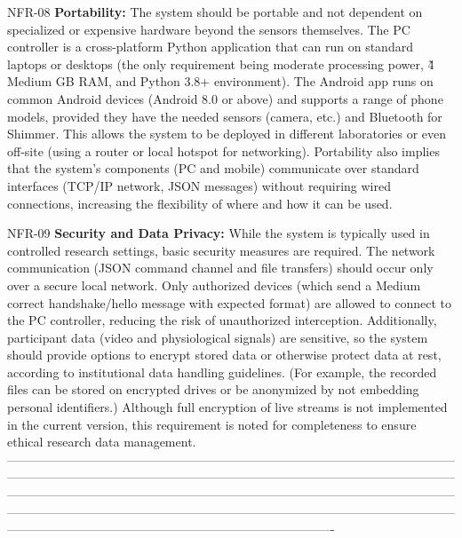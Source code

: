   NFR-08                  \textbf{Portability:} The system should be portable and not dependent on specialized or expensive hardware beyond the sensors themselves. The PC controller is a cross-platform Python application that can run on standard laptops or desktops (the only requirement being moderate processing power, \~4 Medium
                          GB RAM, and Python 3.8+ environment). The Android app runs on common Android devices (Android 8.0 or above) and supports a range of phone models, provided they have the needed sensors (camera, etc.) and Bluetooth for Shimmer. This allows the system to be deployed in different laboratories or  
                          even off-site (using a router or local hotspot for networking). Portability also implies that the system's components (PC and mobile) communicate over standard interfaces (TCP/IP network, JSON messages) without requiring wired connections, increasing the flexibility of where and how it can be 
                          used.                                                                                                                                                                                                                                                                                                 

  NFR-09                  \textbf{Security and Data Privacy:} While the system is typically used in controlled research settings, basic security measures are required. The network communication (JSON command channel and file transfers) should occur only over a secure local network. Only authorized devices (which send a     Medium
                          correct handshake/hello message with expected format) are allowed to connect to the PC controller, reducing the risk of unauthorized interception. Additionally, participant data (video and physiological signals) are sensitive, so the system should provide options to encrypt stored data or     
                          otherwise protect data at rest, according to institutional data handling guidelines. (For example, the recorded files can be stored on encrypted drives or be anonymized by not embedding personal identifiers.) Although full encryption of live streams is not implemented in the current version,  
                          this requirement is noted for completeness to ensure ethical research data management.                                                                                                                                                                                                                
  -------------------------------------------------------------------------------------------------------------------------------------------------------------------------------------------------------------------------------------------------------------------------------------------------------------------------------------------------------------------------------------------------------------------------------------------------------------------------------------------------------------------------------

